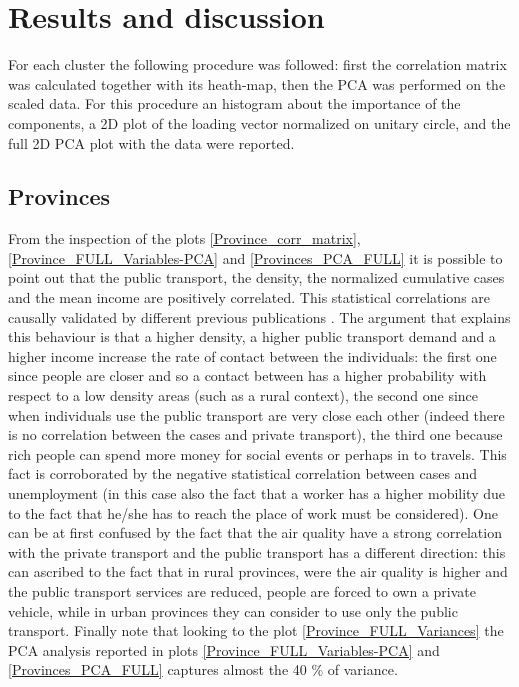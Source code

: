 \documentclass[
12pt, %
a4paper, %
oneside, %
headinclude,footinclude, %
BCOR5mm, %
]{scrartcl}
\begin{document}
\section{Results and discussion}

For each cluster the following procedure was followed: first the correlation matrix was calculated together with its heath-map, then the PCA was performed on the scaled data. For this procedure an histogram about the importance of the components, a 2D plot of the loading vector normalized on unitary circle, and the full 2D PCA plot with the data were reported. 

\subsection{Provinces} \label{sub_prov}

From the inspection of the plots \ref{Province_corr_matrix},\ref{Province_FULL_Variables-PCA} and \ref{Provinces_PCA_FULL} it is possible to point out that the public transport, the density, the normalized cumulative cases and the mean income are positively correlated. This statistical correlations are causally validated by different previous publications \cite{neiderud2015urbanization,world2010hidden,gangemi2020rich,weyers2008low}. The argument that explains this behaviour is that a higher density, a higher public transport demand and a higher income increase the rate of contact between the individuals: the first one since people are closer and so a contact between has a higher probability with respect to a low density areas (such as a rural context), the second one since when individuals use the public transport are very close each other (indeed there is no correlation between the cases and private transport), the third one because rich people can spend more money for social events or perhaps in to travels. This fact is corroborated by the negative statistical correlation between cases and unemployment (in this case also the fact that a worker has a higher mobility due to the fact that he/she has to reach the place of work must be considered). One can be at first confused by the fact that the air quality have a strong correlation with the private transport and the public transport has a different direction: this can ascribed to the fact that in rural provinces, were the air quality is higher and the public transport services are reduced,  people are forced to own a private vehicle, while in urban provinces they can consider to use only the public transport. Finally note that looking to the plot \ref{Province_FULL_Variances} the PCA analysis reported in plots \ref{Province_FULL_Variables-PCA} and \ref{Provinces_PCA_FULL} captures almost the 40 $\%$ of variance. 
\end{document}
